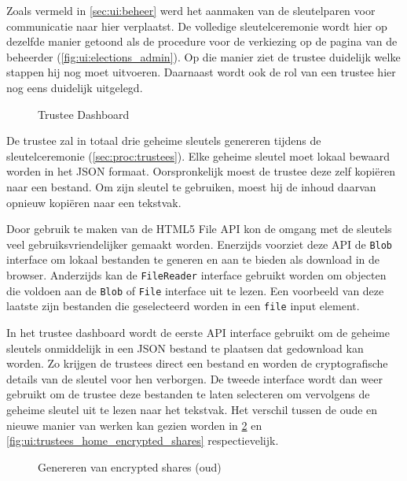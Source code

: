 \npar Zoals vermeld in \ref{sec:ui:beheer} werd het aanmaken van de sleutelparen voor communicatie naar hier verplaatst. De volledige sleutelceremonie wordt hier op dezelfde manier getoond als de procedure voor de verkiezing op de pagina van de beheerder (\ref{fig:ui:elections_admin}). Op die manier ziet de trustee duidelijk welke stappen hij nog moet uitvoeren. Daarnaast wordt ook de rol van een trustee hier nog eens duidelijk uitgelegd.

\begin{figure}
  \caption{Trustee Dashboard}
  \label{fig:ui:trustees_home}
\end{figure}

\npar De trustee zal in totaal drie geheime sleutels genereren tijdens de sleutelceremonie (\ref{sec:proc:trustees}). Elke geheime sleutel moet lokaal bewaard worden in het JSON formaat. Oorspronkelijk moest de trustee deze zelf kopi\"eren naar een bestand. Om zijn sleutel te gebruiken, moest hij de inhoud daarvan opnieuw kopi\"eren naar een tekstvak.

\npar Door gebruik te maken van de HTML5 File API kon de omgang met de sleutels veel gebruiksvriendelijker gemaakt worden.\cite{ranganathan_sicking_file_api} Enerzijds voorziet deze API de \texttt{Blob} interface om lokaal bestanden te generen en aan te bieden als download in de browser. Anderzijds kan de \texttt{FileReader} interface gebruikt worden om objecten die voldoen aan de \texttt{Blob} of \texttt{File} interface uit te lezen. Een voorbeeld van deze laatste zijn bestanden die geselecteerd worden in een \texttt{file} input element.

\npar In het trustee dashboard wordt de eerste API interface gebruikt om de geheime sleutels onmiddelijk in een JSON bestand te plaatsen dat gedownload kan worden. Zo krijgen de trustees direct een bestand en worden de cryptografische details van de sleutel voor hen verborgen. De tweede interface wordt dan weer gebruikt om de trustee deze bestanden te laten selecteren om vervolgens de geheime sleutel uit te lezen naar het tekstvak. Het verschil tussen de oude en nieuwe manier van werken kan gezien worden in \ref{fig:ui:trustees_home_encrypted_shares_old} en \ref{fig:ui:trustees_home_encrypted_shares} respectievelijk.

\begin{figure}
  \caption{Genereren van encrypted shares (oud)}
  \label{fig:ui:trustees_home_encrypted_shares_old}
\end{figure}

